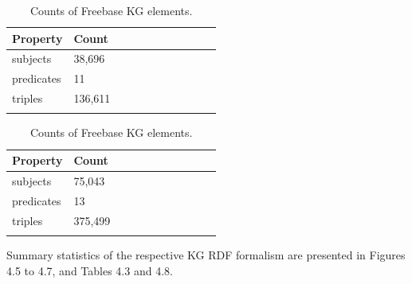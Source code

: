 \begin{table}[H]
	\parbox{.5\linewidth}{
		\centering
		\begin{tabular}{lllllllllll}
  			\textbf{Property} & \textbf{Count}  \\
  			\hline
  			subjects & 38,696  \\
  			predicates & 11  \\
  			triples & 136,611  \\
			&
		\end{tabular}
		\captionsetup{justification=centering}
		\caption{Counts of WordNet KG elements.}
		}
	\hfill
	\parbox{.5\linewidth}{
		\centering
		\begin{tabular}{lllllllllll}
  			\textbf{Property} & \textbf{Count}  \\
  			\hline
  			subjects & 75,043   \\
  			predicates & 13  \\
  			triples & 375,499  \\
			&
		\end{tabular}
		\captionsetup{justification=centering}
		\caption{Counts of Freebase KG elements.}
		}
\end{table}



\noindent Summary statistics of the respective KG RDF formalism are presented in Figures 4.5 to 4.7, and Tables 4.3 and 4.8. \par

\bigskip

